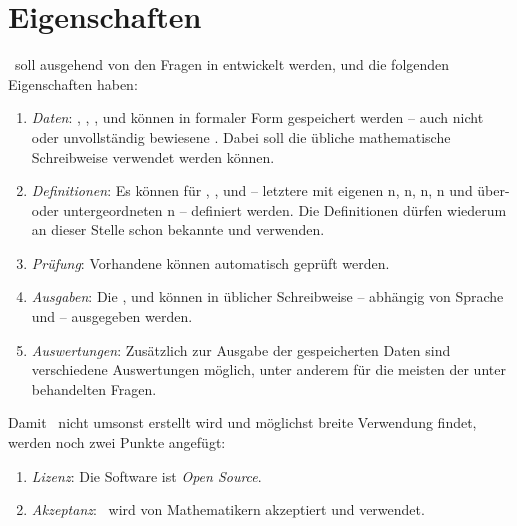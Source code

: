 \section{Eigenschaften}%
\label{sec:Eigenschaften}

\ASBA\ soll ausgehend von den Fragen in  entwickelt werden, und die folgenden Eigenschaften haben:
\begin{enumerate}
	\item \label{Eigenschaft:Daten} \emph{Daten}:
	, , ,  und  können in formaler Form gespeichert werden -- auch nicht oder unvollständig bewiesene .
	Dabei soll die übliche mathematische Schreibweise verwendet werden können.
	\item \label{Eigenschaft:Definitionen} \emph{Definitionen}:
	Es können  für , ,  und  -- letztere mit eigenen n, n, n, n und über- oder untergeordneten n -- definiert werden.
	Die Definitionen dürfen wiederum an dieser Stelle schon bekannte  und  verwenden.
	\item \label{Eigenschaft:Prüfung} \emph{Prüfung}:
	Vorhandene  können automatisch geprüft werden.
	\item \label{Eigenschaft:Ausgaben} \emph{Ausgaben}:
	Die ,  und  können in üblicher Schreibweise -- abhängig von Sprache und  -- ausgegeben werden.
	\item \label{Eigenschaft:Auswertungen} \emph{Auswertungen}:
	Zusätzlich zur Ausgabe der gespeicherten Daten sind verschiedene Auswertungen möglich, unter anderem für die meisten der unter  behandelten Fragen.
	\setcounter{Enumi}{\value{enumi}}%
\end{enumerate}
%
Damit \ASBA\ nicht umsonst erstellt wird und möglichst breite Verwendung findet, werden noch zwei Punkte angefügt:
\begin{enumerate}
	\setcounter{enumi}{\value{Enumi}}%
	\item \label{Eigenschaft:Lizenz} \emph{Lizenz}:
	Die Software ist \emph{Open Source}.
	\item \label{Eigenschaft:Akzeptanz} \emph{Akzeptanz}:
	\ASBA\ wird von Mathematikern akzeptiert und verwendet.
\end{enumerate}
